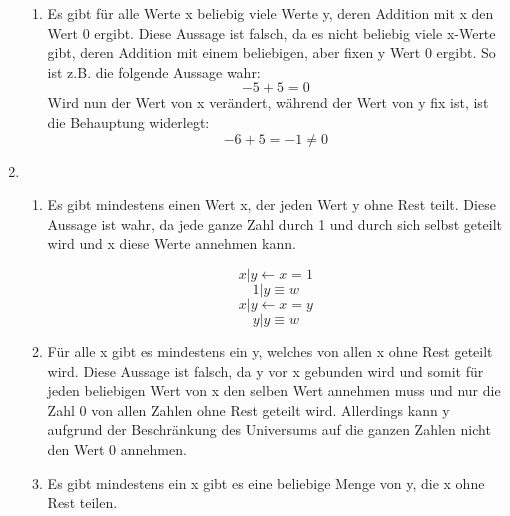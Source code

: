 \documentclass[a4paper]{article}
\begin{document}
\begin{enumerate}
\begin{enumerate}
			\item
			Es gibt für alle Werte x beliebig viele Werte y, deren Addition mit x den Wert 0 ergibt. Diese Aussage ist falsch, da es nicht beliebig viele x-Werte gibt, deren Addition mit einem beliebigen, aber fixen y Wert 0 ergibt.
			\newline
			So ist z.B. die folgende Aussage wahr:
			\begin{equation*}
				-5 + 5 = 0
			\end{equation*}
			Wird nun der Wert von x verändert, während der Wert von y fix ist, ist die Behauptung widerlegt:
			\begin{equation*}
				-6 + 5 = -1 \neq 0
			\end{equation*}
		\end{enumerate}
		
		\item
		\begin{enumerate}
			\item
			Es gibt mindestens einen Wert x, der jeden Wert y ohne Rest teilt.
			\newline
			Diese Aussage ist wahr, da jede ganze Zahl durch 1 und durch sich selbst geteilt wird und x diese Werte annehmen kann.
			
			\begin{equation*}
				x | y \leftarrow x = 1
			\end{equation*}
			\begin{equation*}
				1 | y \equiv w
			\end{equation*}
			\begin{equation*}
				x | y \leftarrow x = y
			\end{equation*}
			\begin{equation*}
				y | y \equiv w
			\end{equation*}
			
			\item
			Für alle x gibt es mindestens ein y, welches von allen x ohne Rest geteilt wird.
			\newline
			Diese Aussage ist falsch, da y vor x gebunden wird und somit für jeden beliebigen Wert von x den selben Wert annehmen muss und nur die Zahl 0 von allen Zahlen ohne Rest geteilt wird. Allerdings kann y aufgrund der Beschränkung des Universums auf die ganzen Zahlen nicht den Wert 0 annehmen.
			
			\item
			Es gibt mindestens ein x gibt es eine beliebige Menge von y, die x ohne Rest teilen.
			\newline
			

\end{enumerate}
\end{enumerate}
\end{document}
